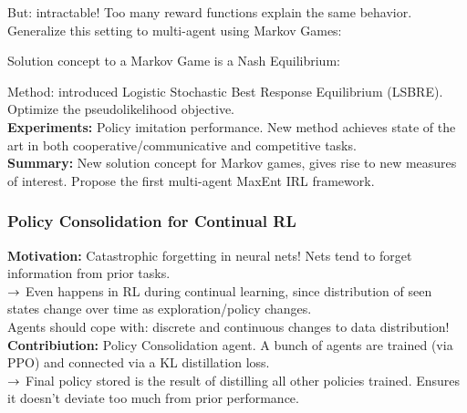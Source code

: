 
But: intractable! Too many reward functions explain the same behavior. \\

Generalize this setting to multi-agent using Markov Games:


Solution concept to a Markov Game is a Nash Equilibrium:

Method: introduced Logistic Stochastic Best Response Equilibrium (LSBRE). Optimize the pseudolikelihood objective. \\

{\bf Experiments:} Policy imitation performance. New method achieves state of the art in both cooperative/communicative and competitive tasks. \\

{\bf Summary:} New solution concept for Markov games, gives rise to new measures of interest. Propose the first multi-agent MaxEnt IRL framework.

\spacerule

\subsubsection{Policy Consolidation for Continual RL~\cite{kaplanis2019policy}}

{\bf Motivation:} Catastrophic forgetting in neural nets! Nets tend to forget information from prior tasks. \\

$\rightarrow$ Even happens in RL during continual learning, since distribution of seen states change over time as exploration/policy changes. \\

Agents should cope with: discrete and continuous changes to data distribution! \\

{\bf Contribiution:} Policy Consolidation agent. A bunch of agents are trained (via PPO) and connected via a KL distillation loss. \\

$\rightarrow$ Final policy stored is the result of distilling all other policies trained. Ensures it doesn't deviate too much from prior performance. \\

